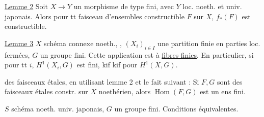 \uline{Lemme 2} Soit $X\to Y$ un morphisme de type fini, avec $Y$ loc. noeth. et univ. japonais.
Alors pour tt faisceau d'ensembles constructible $F$ sur $X$, $f_*(F)$ est constructible.


\uline{Lemme 3} $X$ schéma connexe  noeth.,
,
$(X_i)_{i\in I}$ une partition finie en parties loc. fermées, $G$ un groupe fini.
Cette application est à \uline{fibres finies}. En particulier, si pour tt $i$, $H^1(X_i,G)$ est fini, kif kif pour $H^1(X,G)$.

 des faisceaux étales, en utilisant lemme 2 et le fait suivant :
Si $F,G$ sont des faisceaux  étales constr. sur $X$ noethérien, alors $\operatorname{Hom}(F,G)$ est un ens fini.

$S$  schéma noeth. univ. japonais,
$G$ un groupe fini. Conditions équivalentes.
